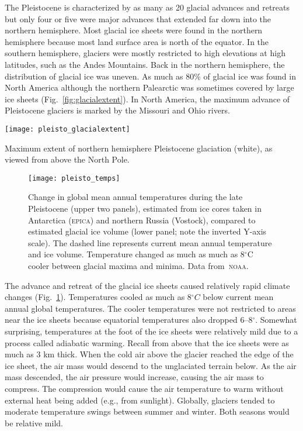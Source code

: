 \documentclass{tufte-handout}
\begin{document}
The Pleistocene is characterized by as many as 20 glacial advances and retreats but only four or five were major advances that extended far down into the northern hemisphere. Most glacial ice sheets were found in the northern hemisphere because most land surface area is north of the equator. In the southern hemisphere, glaciers were mostly restricted to high elevations at high latitudes, such as the Andes Mountains. Back in the northern hemisphere, the distribution of glacial ice was uneven. As much as 80\% of glacial ice was found in North America although the northern Palearctic was sometimes covered by large ice sheets (Fig.~\ref{fig:glacialextent}).  In North America, the maximum advance of Pleistocene glaciers is marked by the Missouri and Ohio rivers. 
\begin{marginfigure}[-2cm]%
  \texttt{[image: pleisto\_glacialextent]}
  \caption{Maximum extent of northern hemisphere Pleistocene glaciation (white), as viewed from above the North Pole.}
  \label{fig:glacialextent}
\end{marginfigure}
\begin{figure}[h]
  \texttt{[image: pleisto\_temps]}%
  \caption{Change in global mean annual temperatures during the late Pleistocene (upper two panels), estimated from ice cores taken in Antarctica (\textsc{epica}) and northern Russia (Vostock), compared to estimated glacial ice volume (lower panel; note the inverted Y-axis scale). The dashed line represents current mean annual temperature and ice volume.  Temperature changed as much as much as 8$^{\circ}$C cooler between glacial maxima and minima. Data from~\textsc{noaa}.}%
  \label{fig:pleistotemps}%
\end{figure}
The advance and retreat of the glacial ice sheets caused relatively rapid climate changes (Fig.~\ref{fig:pleistotemps}). Temperatures cooled as much as 8$^{\circ}C$ below current mean annual global temperatures.  The cooler temperatures were not restricted to areas near the ice sheets because equatorial temperatures also dropped 6--8$^{\circ}$.  Somewhat surprising, temperatures at the foot of the ice sheets were relatively mild due to a process called adiabatic warming.  Recall from above that the ice sheets were as much as 3 km thick.  When the cold air above the glacier reached the edge of the ice sheet, the air mass would descend to the unglaciated terrain below.  As the air mass descended, the air pressure would increase, causing the air mass to compress.  The compression would cause the air temperature to warm without external heat being added (e.g., from sunlight). Globally, glaciers tended to moderate temperature swings between summer and winter.  Both seasons would be relative mild. 
\end{document}
